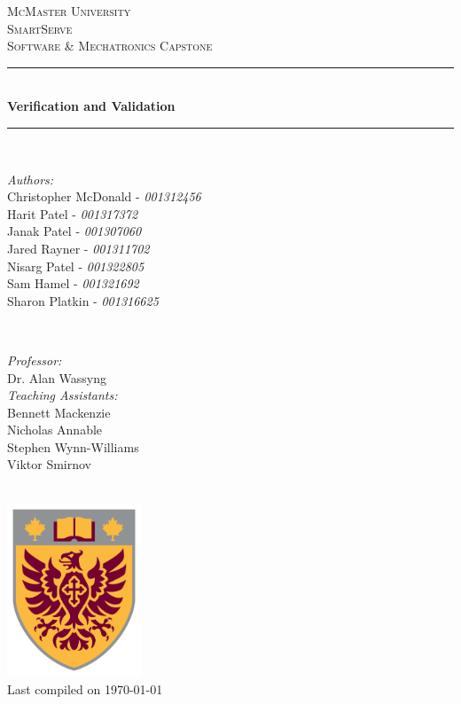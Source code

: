 \documentclass[11pt]{article}
\begin{document}
\begin{titlepage}
	\newcommand{\HRule}{\rule{\linewidth}{0.2mm}}
	\begin{center}
	\textsc{\LARGE McMaster University}\\[1.5cm]

	\textsc{\Large SmartServe}\\[0.5cm]
	\textsc{\large Software \& Mechatronics Capstone}\\[0.5cm]

	\HRule\\[0.4cm]
		{\huge\bfseries Verification and Validation}\\[0.4cm]
	\HRule\\[0.4cm]

	\begin{minipage}[t][][t]{0.5\textwidth}
		\begin{flushleft} \large
			\emph{Authors:}\\
			Christopher McDonald - \textit{001312456} \\
			Harit Patel - \textit{001317372}\\
			Janak Patel - \textit{001307060} \\
			Jared Rayner - \textit{001311702}\\
			Nisarg Patel - \textit{001322805} \\
			Sam Hamel - \textit{001321692} \\
			Sharon Platkin - \textit{001316625} \\
		\end{flushleft}
	\end{minipage}
	~
	\begin{minipage}[t][][t]{0.4\textwidth}
		\begin{flushright} \large
			\emph{Professor:} \\
			Dr. Alan Wassyng \\[0.4cm]
			\emph{Teaching Assistants:} \\
			Bennett Mackenzie \\
			Nicholas Annable \\
			Stephen Wynn-Williams \\
			Viktor Smirnov
		\end{flushright}
	\end{minipage}\\[2cm]

	\includegraphics[width=0.3\textwidth]{logo.png} \\
	{\large Last compiled on \today}
	\end{center}

\end{titlepage}
\end{document}
